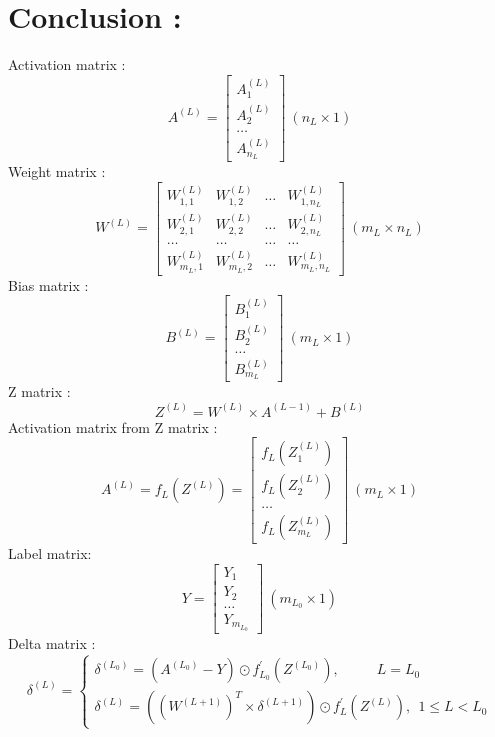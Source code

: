 \documentclass{article}
\begin{document}
    \section*{Conclusion :}
    Activation matrix :
    \[
        A^{(L)} = 
        \begin{bmatrix}
            A^{(L)}_1  \\ A^{(L)}_2 \\ \hdots \\ A^{(L)}_{n_L} 
        \end{bmatrix} \ (n_L \times 1)
    \]
    Weight matrix : 
    \[
        W^{(L)} = 
        \begin{bmatrix}
            W^{(L)}_{1, 1} & W^{(L)}_{1, 2} & \hdots & W^{(L)}_{1, n_L} \\
            W^{(L)}_{2, 1} & W^{(L)}_{2, 2} & \hdots & W^{(L)}_{2, n_L} \\
            \hdots & \hdots & \hdots & \hdots \\
            W^{(L)}_{m_L, 1} & W^{(L)}_{m_L, 2} & \hdots & W^{(L)}_{m_L, n_L} 
        \end{bmatrix} \ (m_L \times n_L)
    \]
    Bias matrix : 
    \[
        B^{(L)} = 
        \begin{bmatrix}
            B^{(L)}_1  \\ B^{(L)}_2 \\ \hdots \\ B^{(L)}_{m_L} 
        \end{bmatrix} \ (m_L \times 1)
    \]
    Z matrix :
    \[Z^{(L)} = W^{(L)} \times A^{(L - 1)} + B^{(L)}\]
    Activation matrix from Z matrix : 
    \[
        A^{(L)} = f_L\left(Z^{(L)}\right) = 
        \begin{bmatrix}
            f_L\left(Z^{(L)}_1\right)  \\ 
            f_L\left(Z^{(L)}_2\right) \\ 
            \hdots \\ 
            f_L\left(Z^{(L)}_{m_L}\right)
        \end{bmatrix} \ (m_L \times 1)
    \]
    Label matrix:
    \[
        Y = 
        \begin{bmatrix}
            Y_1  \\ Y_2 \\ \hdots \\ Y_{m_{L_0}} 
        \end{bmatrix} \ (m_{L_0} \times 1)
    \]
    Delta matrix : 
    \[
        \delta^{(L)} = 
        \begin{cases}
            \delta^{(L_0)} = \left(A^{(L_0)} - Y\right) \odot f^{\prime}_{L_0}\left(Z^{(L_0)}\right), \ \ \ \ \ \ \ \ \ \ \ \ L = L_0 \\
            \delta^{(L)} = \left(\left(W^{(L + 1)}\right)^T \times \delta^{(L + 1)} \right) \odot
            f^{\prime}_{L}\left(Z^{(L)}\right), \ \ 1 \le L < L_0
        \end{cases}
    \]
\end{document}
